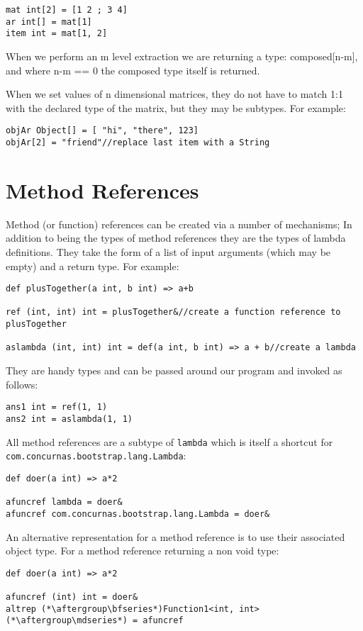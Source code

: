 \documentclass[conc-doc]{subfiles}
\begin{document}
\begin{lstlisting}
mat int[2] = [1 2 ; 3 4]
ar int[] = mat[1]
item int = mat[1, 2]
\end{lstlisting}

When we perform an m level extraction we are returning a type: composed[n-m], and where n-m == 0 the composed type itself is returned.

When we set values of n dimensional matrices, they do not have to match 1:1 with the declared type of the matrix, but they may be subtypes. For example:

\begin{lstlisting}
objAr Object[] = [ "hi", "there", 123]
objAr[2] = "friend"//replace last item with a String
\end{lstlisting}

\section{Method References}
Method (or function) references can be created via a number of mechanisms; In addition to being the types of method references they are the types of lambda definitions. They take the form of a list of input arguments (which may be empty) and a return type. For example:

\begin{lstlisting}
def plusTogether(a int, b int) => a+b

ref (int, int) int = plusTogether&//create a function reference to plusTogether

aslambda (int, int) int = def(a int, b int) => a + b//create a lambda
\end{lstlisting}

They are handy types and can be passed around our program and invoked as follows:
\begin{lstlisting}
ans1 int = ref(1, 1)
ans2 int = aslambda(1, 1)
\end{lstlisting}

All method references are a subtype of \lstinline{lambda} which is itself a shortcut for
\lstinline{com.concurnas.bootstrap.lang.Lambda}:

\begin{lstlisting}
def doer(a int) => a*2

afuncref lambda = doer&
afuncref com.concurnas.bootstrap.lang.Lambda = doer&
\end{lstlisting}

An alternative representation for a method reference is to use their associated object type. For a method reference returning a non void type:
\begin{lstlisting}
def doer(a int) => a*2

afuncref (int) int = doer&
altrep (*\aftergroup\bfseries*)Function1<int, int>(*\aftergroup\mdseries*) = afuncref
\end{lstlisting}
\end{document}
